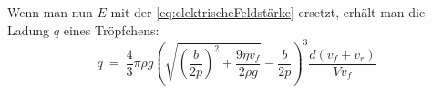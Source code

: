 \noindent Wenn man nun $E$ mit der \autoref{eq:elektrischeFeldstärke} ersetzt, erhält man die Ladung $q$ eines Tröpfchens:
\begin{equation*}
	q \ = \ \frac{4}{3} \pi \rho g \left( \sqrt{\left( \frac{b}{2p}\right)^2 + \frac{9\eta v_f}{2\rho g}} - \frac{b}{2p} \right)^3 \frac{d(v_f + v_r)}{Vv_f}
\end{equation*}







